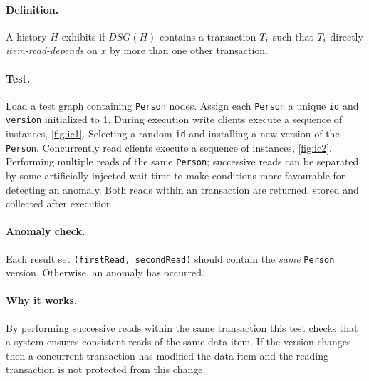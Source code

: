 \paragraph{Definition.}
A history $H$ exhibits  if $\textit{DSG}(H)$ contains a transaction $T_i$ such that $T_i$ directly \emph{item-read-depends} on $x$ by more than one other transaction.

\paragraph{Test.}
Load a test graph containing \texttt{Person} nodes.
Assign each \texttt{Person} a unique \texttt{id} and \texttt{version} initialized to 1.
During execution write clients execute a sequence of  instances, \autoref{fig:ic1}.
Selecting a random \texttt{id} and installing a new version of the \texttt{Person}.
Concurrently read clients execute a sequence of  instances, \autoref{fig:ic2}.
Performing multiple reads of the same \texttt{Person}; successive reads can be separated by some artificially injected wait time to make conditions more favourable for detecting an anomaly.
Both reads within an  transaction are returned, stored and collected after execution.

\paragraph{Anomaly check.}
Each  result set \texttt{(firstRead, secondRead)} should contain the \emph{same} \texttt{Person} version.
Otherwise, an  anomaly has occurred.

\paragraph{Why it works.}
By performing successive reads within the same transaction this test checks that a system ensures consistent reads of the same data item.
If the version changes then a concurrent transaction has modified the data item and the reading transaction is not protected from this change.

